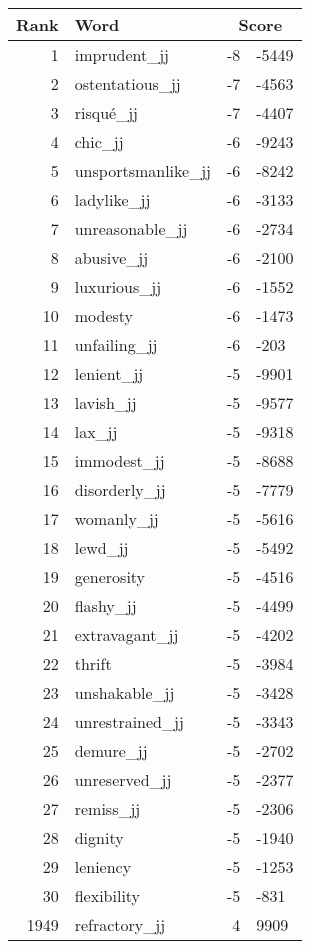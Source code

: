 \begin{longtable}[!htbp]{| rlr@{.}l |}
    \hline
    \textbf{Rank} & \textbf{Word} & \multicolumn{2}{c|}{\textbf{Score}} \\
    \hline
    \endhead
    1 & imprudent\_jj & -8 & -5449 \\
    2 & ostentatious\_jj & -7 & -4563 \\
    3 & risqué\_jj & -7 & -4407 \\
    4 & chic\_jj & -6 & -9243 \\
    5 & unsportsmanlike\_jj & -6 & -8242 \\
    6 & ladylike\_jj & -6 & -3133 \\
    7 & unreasonable\_jj & -6 & -2734 \\
    8 & abusive\_jj & -6 & -2100 \\
    9 & luxurious\_jj & -6 & -1552 \\
    10 & modesty & -6 & -1473 \\
    11 & unfailing\_jj & -6 & -203 \\
    12 & lenient\_jj & -5 & -9901 \\
    13 & lavish\_jj & -5 & -9577 \\
    14 & lax\_jj & -5 & -9318 \\
    15 & immodest\_jj & -5 & -8688 \\
    16 & disorderly\_jj & -5 & -7779 \\
    17 & womanly\_jj & -5 & -5616 \\
    18 & lewd\_jj & -5 & -5492 \\
    19 & generosity & -5 & -4516 \\
    20 & flashy\_jj & -5 & -4499 \\
    21 & extravagant\_jj & -5 & -4202 \\
    22 & thrift & -5 & -3984 \\
    23 & unshakable\_jj & -5 & -3428 \\
    24 & unrestrained\_jj & -5 & -3343 \\
    25 & demure\_jj & -5 & -2702 \\
    26 & unreserved\_jj & -5 & -2377 \\
    27 & remiss\_jj & -5 & -2306 \\
    28 & dignity & -5 & -1940 \\
    29 & leniency & -5 & -1253 \\
    30 & flexibility & -5 & -831 \\
    1949 & refractory\_jj & 4 & 9909 \\

\end{longtable}
